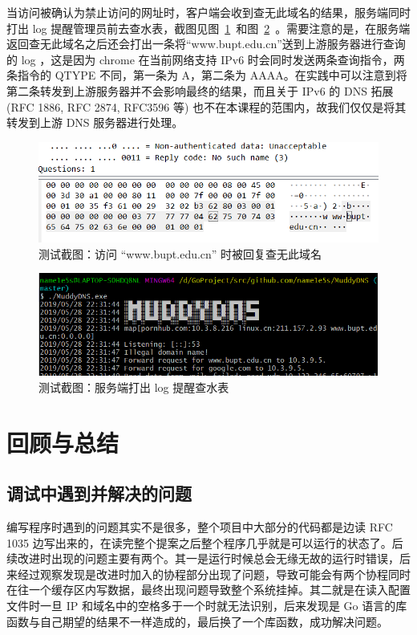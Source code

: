 \documentclass[blue,normal,cn]{elegantnote}
\begin{document}
当访问被确认为禁止访问的网址时，客户端会收到查无此域名的结果，服务端同时打出 log 提醒管理员前去查水表，截图见图~\ref{test_bupt}~和图~\ref{test_nxdomain}~。需要注意的是，在服务端返回查无此域名之后还会打出一条将``www.bupt.edu.cn''送到上游服务器进行查询的 log ，这是因为 chrome 在当前网络支持 IPv6 时会同时发送两条查询指令，两条指令的 QTYPE 不同，第一条为 A，第二条为 AAAA。在实践中可以注意到将第二条转发到上游服务器并不会影响最终的结果，而且关于 IPv6 的 DNS 拓展(RFC 1886, RFC 2874, RFC3596 等) 也不在本课程的范围内，故我们仅仅是将其转发到上游 DNS 服务器进行处理。

\begin{figure}[!htbp]
	\centering
	\includegraphics[width=.9\textwidth]{test_bupt.png}
	\caption{测试截图：访问 ``www.bupt.edu.cn'' 时被回复查无此域名}
	\label{test_bupt}
\end{figure}

\newpage

\begin{figure}[!htbp]
	\centering
	\includegraphics[width=.9\textwidth]{test_nxdomain.png}
	\caption{测试截图：服务端打出 log 提醒查水表}
	\label{test_nxdomain}
\end{figure}

\section{回顾与总结}
\subsection{调试中遇到并解决的问题}
编写程序时遇到的问题其实不是很多，整个项目中大部分的代码都是边读 RFC 1035 边写出来的，在读完整个提案之后整个程序几乎就是可以运行的状态了。后续改进时出现的问题主要有两个。其一是运行时候总会无缘无故的运行时错误，后来经过观察发现是改进时加入的协程部分出现了问题，导致可能会有两个协程同时在往一个缓存区内写数据，最终出现问题导致整个系统挂掉。其二就是在读入配置文件时一旦 IP 和域名中的空格多于一个时就无法识别，后来发现是 Go 语言的库函数与自己期望的结果不一样造成的，最后换了一个库函数，成功解决问题。
\end{document}
